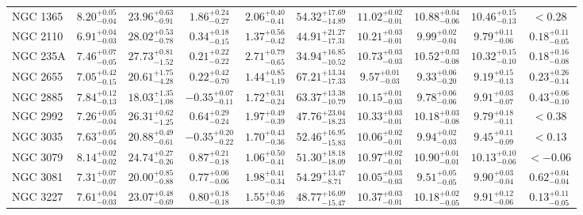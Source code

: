 \documentclass[onecolumn]{mn2e}
\begin{document}
\begin{landscape}
{\begin{center}
\begin{longtable}{lccccccccc}
NGC 1365 & $8.20_{-0.04}^{+0.05}$ & $23.96_{-0.91}^{+0.63}$ & $1.86_{-0.27}^{+0.24}$ & $2.06_{-0.41}^{+0.40}$ &$54.32_{-14.89}^{+17.69}$ & $11.02_{-0.01}^{+0.02}$ & $10.88_{-0.06}^{+0.04}$ & $10.46_{-0.13}^{+0.15}$ & $<0.28$ \\
NGC 2110 & $6.91_{-0.03}^{+0.04}$ & $28.02_{-0.78}^{+0.53}$ & $0.34_{-0.15}^{+0.18}$ & $1.37_{-0.42}^{+0.56}$ &$44.91_{-17.31}^{+21.27}$ & $10.21_{-0.01}^{+0.03}$ & $9.99_{-0.04}^{+0.02}$ & $9.79_{-0.06}^{+0.11}$ & $0.18_{-0.05}^{+0.11}$ \\
NGC 235A & $7.46_{-0.05}^{+0.07}$ & $27.73_{-1.52}^{+0.81}$ & $0.21_{-0.22}^{+0.22}$ & $2.71_{-0.65}^{+0.79}$ &$34.94_{-10.52}^{+16.85}$ & $10.73_{-0.03}^{+0.03}$ & $10.52_{-0.08}^{+0.03}$ & $10.32_{-0.10}^{+0.15}$ & $0.18_{-0.08}^{+0.16}$ \\
NGC 2655 & $7.05_{-0.15}^{+0.42}$ & $20.61_{-4.28}^{+1.75}$ & $0.22_{-0.70}^{+0.42}$ & $1.44_{-1.19}^{+0.85}$ &$67.21_{-17.33}^{+13.34}$ & $9.57_{-0.03}^{+0.01}$ & $9.33_{-0.20}^{+0.06}$ & $9.19_{-0.13}^{+0.15}$ & $0.23_{-0.14}^{+0.26}$ \\
NGC 2885 & $7.84_{-0.13}^{+0.12}$ & $18.03_{-1.08}^{+1.35}$ & $-0.35_{-0.11}^{+0.07}$ & $1.72_{-0.24}^{+0.31}$ &$63.37_{-10.79}^{+13.38}$ & $10.15_{-0.03}^{+0.01}$ & $9.78_{-0.06}^{+0.06}$ & $9.91_{-0.07}^{+0.03}$ & $0.43_{-0.10}^{+0.06}$ \\
NGC 2992 & $7.26_{-0.04}^{+0.05}$ & $26.31_{-1.25}^{+0.62}$ & $0.64_{-0.24}^{+0.29}$ & $1.97_{-0.39}^{+0.49}$ &$47.76_{-18.23}^{+23.04}$ & $10.33_{-0.01}^{+0.03}$ & $10.18_{-0.08}^{+0.03}$ & $9.79_{-0.11}^{+0.18}$ & $<0.38$ \\
NGC 3035 & $7.63_{-0.04}^{+0.05}$ & $20.88_{-0.61}^{+0.49}$ & $-0.35_{-0.22}^{+0.20}$ & $1.70_{-0.36}^{+0.43}$ &$52.46_{-15.83}^{+16.95}$ & $10.06_{-0.01}^{+0.02}$ & $9.94_{-0.03}^{+0.02}$ & $9.45_{-0.09}^{+0.11}$ & $<0.13$ \\
NGC 3079 & $8.14_{-0.02}^{+0.02}$ & $24.74_{-0.26}^{+0.27}$ & $0.87_{-0.18}^{+0.21}$ & $1.06_{-0.41}^{+0.50}$ &$51.30_{-18.09}^{+18.18}$ & $10.97_{-0.01}^{+0.02}$ & $10.90_{-0.01}^{+0.01}$ & $10.13_{-0.06}^{+0.10}$ & $<-0.06$ \\
NGC 3081 & $7.31_{-0.07}^{+0.07}$ & $20.00_{-0.88}^{+0.85}$ & $0.77_{-0.06}^{+0.06}$ & $1.98_{-0.34}^{+0.41}$ &$54.29_{-8.71}^{+13.47}$ & $10.05_{-0.03}^{+0.03}$ & $9.51_{-0.05}^{+0.05}$ & $9.90_{-0.04}^{+0.03}$ & $0.62_{-0.04}^{+0.04}$ \\
NGC 3227 & $7.61_{-0.03}^{+0.04}$ & $23.07_{-0.69}^{+0.48}$ & $0.80_{-0.18}^{+0.18}$ & $1.55_{-0.39}^{+0.46}$ &$48.77_{-15.47}^{+16.09}$ & $10.37_{-0.01}^{+0.03}$ & $10.18_{-0.05}^{+0.02}$ & $9.91_{-0.06}^{+0.12}$ & $0.13_{-0.05}^{+0.11}$ \\

\end{longtable}
\end{center}}
\end{landscape}
\end{document}
